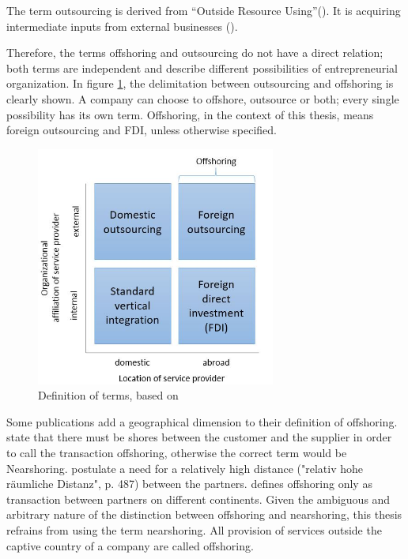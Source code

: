 The term outsourcing is derived from ``Outside Resource Using''(\cite[p. 46]{Specht.2007b}). It is acquiring intermediate inputs from external businesses (\cite[p. 46]{Specht.2007b}).

Therefore, the terms offshoring and outsourcing do not have a direct relation; both terms are independent and describe different possibilities of entrepreneurial organization. In figure \ref{fig:DefTerms}, the delimitation between outsourcing and offshoring is clearly shown. A company can choose to offshore, outsource or both; every single possibility has its own term. Offshoring, in the context of this thesis, means foreign outsourcing and \ac{FDI}, unless otherwise specified.

\begin{figure}[htb]
	\centering
	\includegraphics[width=0.7\textwidth]{Pictures/Terms_definition}
	\caption{Definition of terms, based on \cite[pp. 552f]{Antras.2004}}
	\label{fig:DefTerms}
\end{figure}

Some publications add a geographical dimension to their definition of offshoring. \cite{Jahns.2007} state that there must be shores between the customer and the supplier in order to call the transaction offshoring, otherwise the correct term would be Nearshoring. \cite{Cappallo.2006} postulate a need for a relatively high distance ("relativ hohe räumliche Distanz", p. 487) between the partners. \cite{Dressler.2007} defines offshoring only as transaction between partners on different continents. Given the ambiguous and arbitrary nature of the distinction between offshoring and nearshoring, this thesis refrains from using the term nearshoring. All provision of services outside the captive country of a company are called offshoring.

